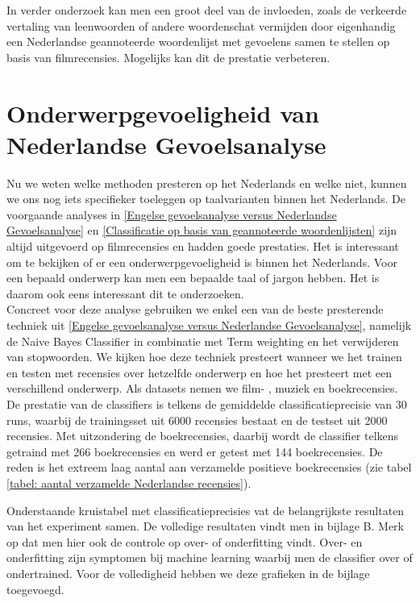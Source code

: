 In verder onderzoek kan men een groot deel van de invloeden, zoals de verkeerde vertaling van leenwoorden of andere woordenschat vermijden door eigenhandig een Nederlandse geannoteerde woordenlijst met gevoelens samen te stellen op basis van filmrecensies. Mogelijks kan dit de prestatie verbeteren.


\section{Onderwerpgevoeligheid van Nederlandse Gevoelsanalyse}\label{Onderwerpgevoeligheid van Nederlandse Gevoelsanalyse}

Nu we weten welke methoden presteren op het Nederlands en welke niet, kunnen we ons nog iets specifieker toeleggen op taalvarianten binnen het Nederlands. De voorgaande analyses in \ref{Engelse gevoelsanalyse versus Nederlandse Gevoelsanalyse} en \ref{Classificatie op basis van geannoteerde woordenlijsten} zijn altijd uitgevoerd op filmrecensies en hadden goede prestaties. Het is interessant om te bekijken of er een onderwerpgevoeligheid is binnen het Nederlands. Voor een bepaald onderwerp kan men een bepaalde taal of jargon hebben. Het is daarom ook eens interessant dit te onderzoeken. \\

Concreet voor deze analyse gebruiken we enkel een van de beste presterende techniek uit \ref{Engelse gevoelsanalyse versus Nederlandse Gevoelsanalyse}, namelijk de Naive Bayes Classifier in combinatie met Term weighting en het verwijderen van stopwoorden. We kijken hoe deze techniek presteert wanneer we het trainen en testen met recensies over hetzelfde onderwerp en hoe het presteert met een verschillend onderwerp.  Als datasets nemen we film- , muziek en boekrecensies. De prestatie van de classifiers is telkens de gemiddelde classificatieprecisie van 30 runs, waarbij de trainingsset uit 6000 recensies bestaat en de testset uit 2000 recensies. Met uitzondering de boekrecensies, daarbij wordt de classifier telkens getraind met 266 boekrecensies en werd er getest met 144 boekrecensies. De reden is het extreem laag aantal aan verzamelde positieve boekrecensies (zie tabel \ref{tabel: aantal verzamelde Nederlandse recensies}).


Onderstaande kruistabel met classificatieprecisies vat de belangrijkste resultaten van het experiment samen. De volledige resultaten vindt men in bijlage B. Merk op dat men hier ook de controle op over- of onderfitting vindt. Over- en onderfitting zijn symptomen bij machine learning waarbij men de classifier over of ondertrained. Voor de volledigheid hebben we deze grafieken in de bijlage toegevoegd.    

